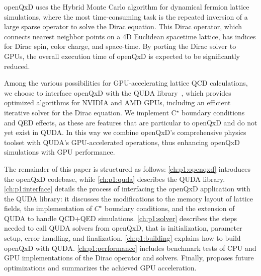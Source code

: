 openQxD uses the Hybrid Monte Carlo algorithm for dynamical fermion lattice simulations, where the most time-consuming task is the repeated inversion of a large sparse operator to solve the Dirac equation. This Dirac operator, which connects nearest neighbor points on a 4D Euclidean spacetime lattice, has indices for Dirac spin, color charge, and space-time. By porting the Dirac solver to GPUs, the overall execution time of openQxD is expected to be significantly reduced.

Among the various possibilities for GPU-accelerating lattice QCD calculations, we choose to interface openQxD with the QUDA library~\cite{QUDApaper}, which provides optimized algorithms for NVIDIA and AMD GPUs, including an efficient iterative solver for the Dirac equation. 
We implement C$^\star$ boundary conditions and QED effects, as these are features that are particular to openQxD and do not yet exist in QUDA. In this way we combine openQxD's comprehensive physics toolset with QUDA's GPU-accelerated operations, thus enhancing openQxD simulations with GPU performance.

The remainder of this paper is structured as follows: \cref{ch:p1:openqxd} introduces the openQxD codebase, while \cref{ch:p1:quda} describes the QUDA library. \cref{ch:p1:interface} details the process of interfacing the openQxD application with the QUDA library: it discusses the modifications to the memory layout of lattice fields, the implementation of $C^\star$ boundary conditions, and the extension of QUDA to handle QCD+QED simulations. \cref{ch:p1:solver} describes the steps needed to call QUDA solvers from openQxD, that is initialization, parameter setup, error handling, and finalization. \cref{ch:p1:building} explains how to build openQxD with QUDA. \cref{ch:p1:performance} includes benchmark tests of CPU and GPU implementations of the Dirac operator and solvers. Finally,  proposes future optimizations and summarizes the achieved GPU acceleration.
